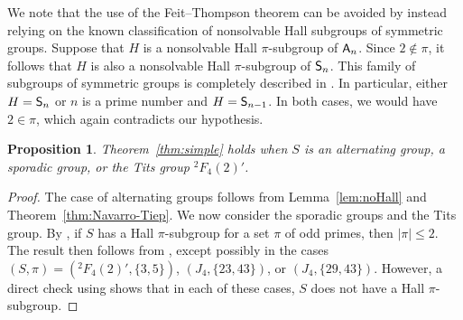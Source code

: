 \documentclass[12pt]{amsart}
\newtheorem{proposition}[theorem]{Proposition}
\theoremstyle{definition}
\numberwithin{equation}{section}
\newcommand{\Irr}{{\mathrm {Irr}}}
\newcommand{\QQ}{{\mathbb Q}}
\newcommand{\ZZ}{{\mathbb Z}}
\newcommand{\Al}{\textup{\textsf{A}}}
\newcommand{\Sy}{\textup{\textsf{S}}}
\begin{document}
We note that the use of the Feit--Thompson theorem can be avoided by
instead relying on the known classification %
of nonsolvable Hall
subgroups of %
symmetric groups. Suppose that $H$ is %
a nonsolvable
Hall $\pi$-subgroup %
of $\Al_n$. Since $2 \notin \pi$, it follows
that $H$ is also %
a nonsolvable Hall %
$\pi$-subgroup of $\Sy_n$. This
family of subgroups of symmetric groups is completely described in
\cite{Thompson}. In particular, either $H = \Sy_n$ or $n$ is a prime
number and $H = \Sy_{n-1}$. In both cases, we would have $2 \in
\pi$, which again contradicts our %
hypothesis.



\begin{proposition}\label{prop:alternatingandsporadic}
Theorem~\ref{thm:simple} holds when $S$ is an alternating group, a
sporadic group, %
or the Tits group ${}^2F_4(2)'$.
\end{proposition}

\begin{proof}
The case of alternating groups follows from Lemma~\ref{lem:noHall}
and Theorem~\ref{thm:Navarro-Tiep}. We now consider the sporadic
groups and the Tits group. By \cite[Theorem~6.14]{G86}, if $S$ has a
Hall $\pi$-subgroup for a set $\pi$ of odd primes, then $|\pi| \le
2$. The result then follows from \cite[Theorem~2.1]{GHSV21}, except
possibly in the cases $(S,\pi)=({}^2F_4(2)',\{3,5\})$, $(J_4,
\{23,43\})$, or $(J_4,\{29,43\})$. However, a direct check using
\cite{Atl1} shows that in each of these cases, $S$ does not have a
Hall $\pi$-subgroup.
\end{proof}
\end{document}
